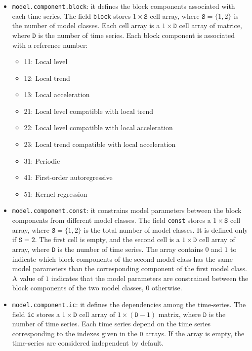\begin{itemize}

\item \lstinline[basicstyle = \mlttfamily \small ]!model.component.block!: it defines the block components associated with each time-series.
The field \lstinline[basicstyle = \mlttfamily \small ]!block! stores $1\times \mathtt{S}$ cell array, where $\mathtt{S} = \{1,2 \}$ is the number of model classes.
Each cell array is a $1\times \mathtt{D}$ cell array of matrice, where $\mathtt{D}$ is the number of time series.
Each block component is associated with a reference number:
\begin{itemize}
\item 11: Local level 
\item 12: Local trend
\item 13: Local acceleration
\item 21: Local level compatible with local trend
\item 22: Local level compatible with local acceleration
\item 23: Local trend compatible with local acceleration
\item 31: Periodic
\item 41: First-order autoregressive
\item 51: Kernel regression
\end{itemize}

\item  \lstinline[basicstyle = \mlttfamily \small ]!model.component.const!: it constrains model parameters between the block components from different model classes.
The field \lstinline[basicstyle = \mlttfamily \small ]!const! stores a $1\times \mathtt{S}$ cell array, where $\mathtt{S} = \{1, 2 \}$ is the total number of model classes.
It is defined only if $\mathtt{S} = 2$.
The first cell is empty, and the second cell is a $1\times \mathtt{D}$ cell array of array, where $\mathtt{D}$ is the number of time series.
The array contains $0$ and $1$ to indicate which block components of the second model class has the same model parameters than the corresponding component of the first model class. 
A value of $1$ indicates that the model parameters are constrained between the block components of the two model classes, $0$ otherwise.

\item  \lstinline[basicstyle = \mlttfamily \small ]!model.component.ic!:  it defines the dependencies among the time-series.
The field \lstinline[basicstyle = \mlttfamily \small ]!ic! stores a $1\times \mathtt{D}$ cell array of $1\times (\mathtt{D}-1)$ matrix, where $\mathtt{D}$ is the number of time series.
Each time series depend on the time series corresponding to the indexes given in the $\mathtt{D}$ arrays.
If the array is empty, the time-series are considered independent by default.

\end{itemize}


